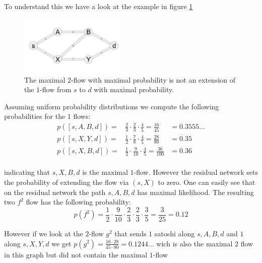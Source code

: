\documentclass[10pt,twocolumn]{article}
\begin{document}

To understand this we have a look at the example in figure \ref{fig:counterexample}
\begin{figure}[htpb]
  \center
  \includegraphics[width=0.45\textwidth]{img/counterexample.jpg}
  \caption{The maximal $2$-flow with maximal probability is not an extension of the $1$-flow from  $s$ to $d$ with maximal probability.}
  \label{fig:counterexample}
\end{figure}
Assuming uniform probability distributions we compute the following probabilities for the $1$ flows:
\[
\begin{aligned}
p([s,A,B,d]) = & \frac{2}{3}\cdot\frac{2}{3}\cdot\frac{4}{5}=\frac{16}{45}& =0.3555\dots \\ 
p([s,X,Y,d]) = & \frac{1}{2}\cdot\frac{7}{8}\cdot\frac{4}{5}=\frac{28}{80}& =0.35 \\
p([s,X,B,d]) = & \frac{1}{2}\cdot\frac{9}{10}\cdot\frac{4}{5}=\frac{36}{100}& =0.36 \\
\end{aligned}
\]

indicating that $s,X,B,d$ is the maximal $1$-flow.
However the residual network sets the probability of extending the flow via $(s,X)$ to zero.
One can easily see that on the residual network the path $s,A,B,d$ has maximal likelihood.
The resulting two $f^2$ flow has the following probability:
\[
p(f^2) = \frac{1}{2}\cdot \frac{9}{10}\cdot \frac{2}{3}\cdot \frac{2}{3}\cdot \frac{3}{5} = \frac{3}{25}=0.12
\]

However if we look at the $2$-flow $g^2$ that sends $1$ satoshi along $s,A,B,d$ and $1$ along $s,X,Y,d$ we get $p(g^2)=\frac{16\cdot 28}{45\cdot 80} = 0.1244\dots$ 
wich is also the maximal $2$ flow in this graph but did not contain the maximal $1$-flow
\end{document}
